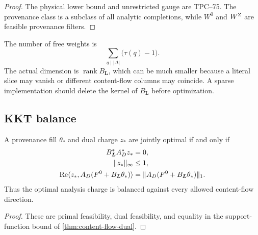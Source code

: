 \begin{proof}
The physical lower bound and unrestricted gauge are TPC--75.  The
provenance class is a subclass of all analytic completions, while
\(W^0\) and \(W^{\rm Z}\) are feasible provenance filters.
\end{proof}

\begin{remark}
The number of free weights is
\[
 \sum_{q\mid|\Delta|}\bigl(\tau(q)-1\bigr).
\]
The actual dimension is
\(\operatorname{rank}B_{\boldsymbol L}\), which can be much smaller
because a literal slice may vanish or different content-flow columns may
coincide.  A sparse implementation should delete the kernel of
\(B_{\boldsymbol L}\) before optimization.
\end{remark}

\subsection{KKT balance}

\begin{proposition}
\label{prop:content-KKT}
A provenance fill \(\theta_*\) and dual charge \(z_*\) are jointly
optimal if and only if
\begin{align*}
 B_{\boldsymbol L}^*A_D^*z_*&=0,\\
 \|z_*\|_\infty&\le1,\\
 \operatorname{Re}\langle z_*,
 A_D(F^0+B_{\boldsymbol L}\theta_*)\rangle
 &=
 \|A_D(F^0+B_{\boldsymbol L}\theta_*)\|_1.
\end{align*}
Thus the optimal analysis charge is balanced against every allowed
content-flow direction.
\end{proposition}

\begin{proof}
These are primal feasibility, dual feasibility, and equality in the
support-function bound of \cref{thm:content-flow-dual}.
\end{proof}
